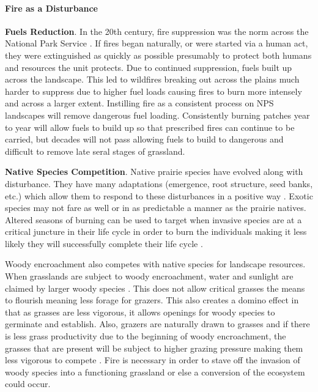 \hypertarget{fire-as-a-disturbance}{%
\paragraph{Fire as a Disturbance}\label{fire-as-a-disturbance}}

\textbf{Fuels Reduction}. 
In the 20th century, fire suppression was the norm across the National Park Service \citep{umbanhowarjr1996, bachelet2000}. 
If fires began naturally, or were started via a human act, they were extinguished as quickly as possible presumably to protect both humans and resources the unit protects. 
Due to continued suppression, fuels built up across the landscape. 
This led to wildfires breaking out across the plains much harder to suppress due to higher fuel loads causing fires to burn more intensely and across a larger extent.
Instilling fire as a consistent process on NPS landscapes will remove dangerous fuel loading. 
Consistently burning patches year to year will allow fuels to build up so that prescribed fires can continue to be carried, but decades will not pass allowing fuels to build to dangerous and difficult to remove late seral stages of grassland.

\textbf{Native Species Competition}. 
Native prairie species have evolved along with disturbance. 
They have many adaptations (emergence, root structure, seed banks, etc.) which allow them to respond to these disturbances in a positive way \citep{hobbs1992, lawes2013, russell2015, midgley2016}. 
Exotic species may not fare as well or in as predictable a manner as the prairie natives.
Altered seasons of burning can be used to target when invasive species are at a critical juncture in their life cycle in order to burn the individuals making it less likely they will successfully complete their life cycle \citep{mcgranahan2012, mcgranahan2013a}.

Woody encroachment also competes with native species for landscape
resources. 
When grasslands are subject to woody encroachment, water and sunlight are claimed by larger woody species \citep{twidwell2013}.
This does not allow critical grasses the means to flourish meaning less forage for grazers. 
This also creates a domino effect in that as grasses are less vigorous, it allows openings for woody species to germinate and establish. 
Also, grazers are naturally drawn to grasses and if there is less grass productivity due to the beginning of woody encroachment, the grasses that are present will be subject to higher grazing pressure making them less vigorous to compete \citep{briggs2005}. 
Fire is necessary in order to stave off the invasion of woody species into a functioning grassland or else a conversion of the ecosystem could occur.

